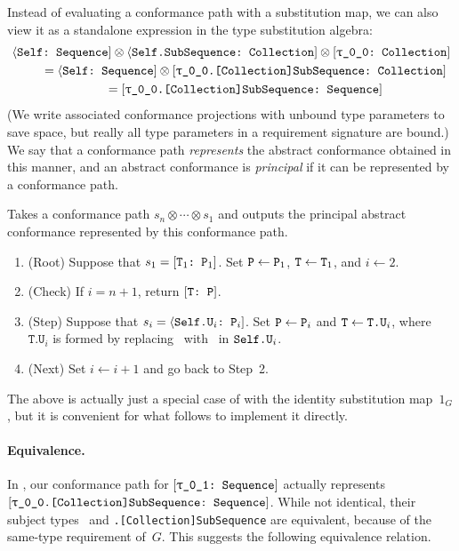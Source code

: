 \documentclass[../generics]{subfiles}
\begin{document}
Instead of evaluating a conformance path with a substitution map, we can also view it as a standalone expression in the type substitution algebra:
\begin{gather*}
\SelfSequence \otimes \SelfSubSequence \otimes \rTCollection\\
\qquad {} = \SelfSequence \otimes \ConfReq{\rT.[Collection]SubSequence}{Collection}\\
\qquad {} = \ConfReq{\rT.[Collection]SubSequence}{Sequence}
\end{gather*}
(We write associated conformance projections with unbound type parameters to save space, but really all type parameters in a requirement signature are bound.)
We say that a conformance path \emph{represents} the abstract conformance obtained in this manner, and an abstract conformance is \emph{principal} if it can be represented by a conformance path.

\begin{algorithm}\label{invertconformancepath}
Takes a conformance path $s_n\otimes\cdots\otimes s_1$ and outputs the principal abstract conformance represented by this conformance path.
\begin{enumerate}
\item (Root) Suppose that $s_1=[\texttt{$\texttt{T}_1$:~$\texttt{P}_1$}]$. Set $\texttt{P} \leftarrow \texttt{P}_1$, $\texttt{T} \leftarrow \texttt{T}_1$, and $i\leftarrow 2$.
\item (Check) If $i=n+1$, return $[\texttt{T:~P}]$.
\item (Step) Suppose that $s_i=\langle\texttt{$\texttt{Self.U}_i$:~$\texttt{P}_i$}]$. Set $\texttt{P} \leftarrow \texttt{P}_i$ and $\texttt{T}\leftarrow \texttt{T.U}_i$, where $\texttt{T.U}_i$ is formed by replacing \tSelf\ with \tT\ in $\texttt{Self.U}_i$.
\item (Next) Set $i\leftarrow i+1$ and go back to Step~2.
\end{enumerate}
The above is actually just a special case of  with the identity substitution map~$1_G$, but it is convenient for what follows to implement it directly.
\end{algorithm}

\paragraph{Equivalence.}
In , our conformance path for $\ConfReq{\rU}{Sequence}$ actually represents $\ConfReq{\rT.[Collection]SubSequence}{Sequence}$. While not identical, their subject types \rU\ and \texttt{\rT.[Collection]SubSequence} are equivalent, because of the same-type requirement of~$G$. This suggests the following equivalence relation.
\end{document}
